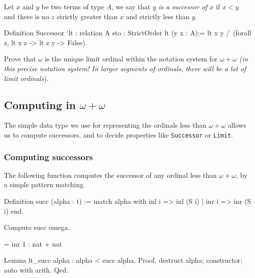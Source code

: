 Let $x$ and $y$ be two terms of type $A$, we say that \emph{$y$ is a successor of $x$}
if $x<y$ and there is no $z$ strictly greater than $x$ and  strictly less than $y$.



\begin{Coqsrc}
Definition Successor `{lt : relation A}
           {sto : StrictOrder lt} (y x : A):=
  lt x y /\ (forall z,  lt x z -> lt z y -> False).
\end{Coqsrc}



\begin{exercise}
Prove that $\omega$ is the unique   limit ordinal within the notation system for $\omega+\omega$
\emph{(in this precise notation system! In larger segments of 
ordinals, there will be \emph{a lot} of limit ordinals}).
\end{exercise}


\subsection{Computing in \texorpdfstring{$\omega+\omega$}{omega+omega}}

The simple data type we use for representing the ordinals less than $\omega+\omega$ allows us to compute successors, and to decide properties like \texttt{Successor} or \texttt{Limit}. 

\subsubsection{Computing successors}

The following function computes the successor of any ordinal less than $\omega+\omega$, by a simple pattern matching.


\begin{Coqsrc}
Definition succ (alpha : t) := match alpha with
                                 inl i => inl (S i)
                               | inr i => inr (S i)
                               end.

Compute succ omega.
\end{Coqsrc}


\begin{Coqanswer}
  = inr 1
     : nat + nat
\end{Coqanswer}

\begin{Coqsrc}
Lemma lt_succ alpha : alpha < succ alpha.
Proof.
 destruct alpha; constructor; auto with arith. 
Qed.
\end{Coqsrc}

